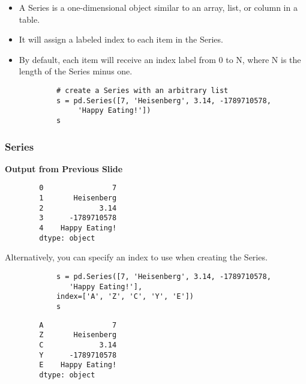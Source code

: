 \documentclass[MASTER.tex]{subfiles}
\begin{document}
	\begin{frame}[fragile]
		\begin{itemize}
		\item A Series is a one-dimensional object similar to an array, list, or column in a table. 
		\item It will assign a labeled index to each item in the Series. \item By default, each item will receive an index label from 0 to N, where N is the length of the Series minus one.
		\end{itemize}
		
		
		\begin{framed}
			\begin{verbatim}
			# create a Series with an arbitrary list
			s = pd.Series([7, 'Heisenberg', 3.14, -1789710578,
			     'Happy Eating!'])
			s
			\end{verbatim}
		\end{framed}

\end{frame}
\begin{frame}[fragile]
\frametitle{Series}
\textbf{Output from Previous Slide}
\begin{framed}		
		\begin{verbatim}
		0                7
		1       Heisenberg
		2             3.14
		3      -1789710578
		4    Happy Eating!
		dtype: object
		\end{verbatim}
\end{framed}
	\end{frame}
	\begin{frame}[fragile]
		
		Alternatively, you can specify an index to use when creating the Series.
		
		\begin{framed}
			\begin{verbatim}
			s = pd.Series([7, 'Heisenberg', 3.14, -1789710578, 
			   'Happy Eating!'],
			index=['A', 'Z', 'C', 'Y', 'E'])
			s
			\end{verbatim}
		\end{framed}
		\begin{verbatim}
		A                7
		Z       Heisenberg
		C             3.14
		Y      -1789710578
		E    Happy Eating!
		dtype: object
		\end{verbatim}
	\end{frame}
\end{document}
